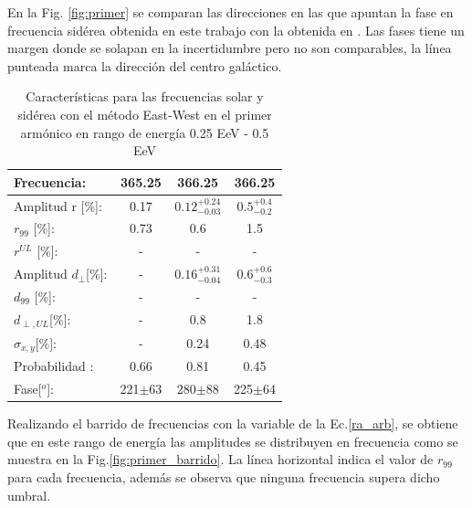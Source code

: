 \documentclass[11pt,papel,oneside,singlespace]{ibtesis}
\begin{document}
En la Fig. \ref{fig:primer} se comparan las direcciones en las que apuntan la fase en frecuencia sidérea obtenida en este trabajo con la obtenida en \cite{Aab_2020}. 
Las fases tiene un margen donde se solapan en la incertidumbre pero no son comparables, la línea punteada marca la dirección del centro galáctico.
\begin{table}[H]
    \begin{small}
        \begin{center}
            \begin{tabular}[c]{l|c||c|c}
                Frecuencia:                 & 365.25	  & 366.25	                    & 366.25 \cite{Aab_2020}   \\ 
                \hline
                Amplitud r [\%]:            & 0.17	      & $0.12^{+0.24}_{-0.03}$ 	    & $0.5^{+0.4}_{-0.2}$ \cite{codigo}      \\
                $r_{99}$ [\%]:              & 0.73	      & 0.6                         & 1.5\cite{codigo}                 \\
                $r^{UL}$ [\%]:              & - 	      & -                           & -\cite{codigo}                 \\
                \hline
                Amplitud $d_\perp$[\%]:     & -	          & $0.16^{+0.31}_{-0.04}$ 	    & $0.6^{+0.6}_{-0.3}$       \\
                $d_{99}$ [\%]:              & - 	      & -                           & -                 \\
                $d_{\perp,UL}$[\%]:         & -           & 0.8       & 1.8      \\
                \hline
                $\sigma_{x,y}$[\%]:         & -	          & 0.24	   & 0.48       \\
                Probabilidad      :         & 0.66        & 0.81	   & 0.45       \\
                Fase[$^o$]:                 & 221$\pm$63  & 280$\pm$88 & 225$\pm$64\cite{discrepancia} \\
            \end{tabular}
        \end{center}
    \end{small}
    \caption{Características para las frecuencias solar y sidérea con el método East-West en el primer armónico en rango de energía 0.25 EeV - 0.5 EeV}
    \label{tab:solar}
\end{table}


Realizando el barrido de frecuencias con la variable de la Ec.\ref{ra_arb}, se obtiene que en este rango de energía las amplitudes se  distribuyen en frecuencia como se muestra en la Fig.\ref{fig:primer_barrido}. La línea horizontal indica el valor de $r_{99}$ para cada frecuencia, además se observa que ninguna frecuencia supera dicho umbral.
\end{document}
